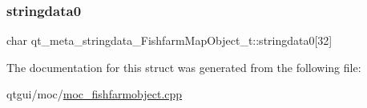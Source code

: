 \subsubsection{\texorpdfstring{stringdata0}{stringdata0}}
{\footnotesize\ttfamily char qt\+\_\+meta\+\_\+stringdata\+\_\+\+Fishfarm\+Map\+Object\+\_\+t\+::stringdata0\mbox{[}32\mbox{]}}



The documentation for this struct was generated from the following file\+:\begin{DoxyCompactItemize}
\item 
qtgui/moc/\mbox{\hyperlink{moc__fishfarmobject_8cpp}{moc\+\_\+fishfarmobject.\+cpp}}\end{DoxyCompactItemize}
